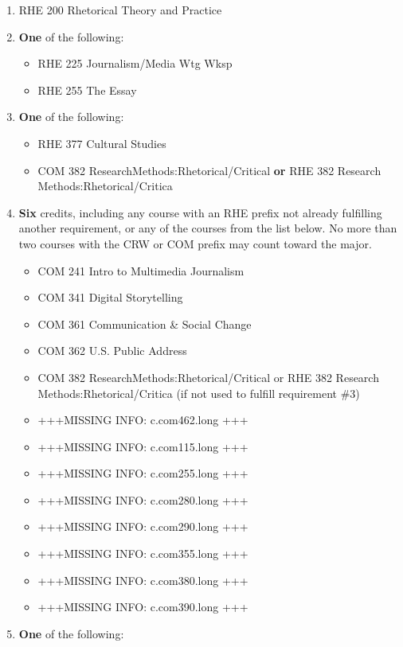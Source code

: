 \documentclass[
  letterpaper,
]{scrbook}
\providecommand{\tightlist}{%
  \setlength{\itemsep}{0pt}\setlength{\parskip}{0pt}}
\begin{document}
\begin{enumerate}
\def\labelenumi{\arabic{enumi}.}
\item
  RHE 200 Rhetorical Theory and Practice
\item
  \textbf{One} of the following:

  \begin{itemize}
  \tightlist
  \item
    RHE 225 Journalism/Media Wtg Wksp
  \item
    RHE 255 The Essay
  \end{itemize}
\item
  \textbf{One} of the following:

  \begin{itemize}
  \tightlist
  \item
    RHE 377 Cultural Studies
  \item
    COM 382 ResearchMethods:Rhetorical/Critical \textbf{or} RHE 382
    Research Methods:Rhetorical/Critica
  \end{itemize}
\item
  \textbf{Six} credits, including any course with an RHE prefix not
  already fulfilling another requirement, or any of the courses from the
  list below. No more than two courses with the CRW or COM prefix may
  count toward the major.

  \begin{itemize}
  \tightlist
  \item
    COM 241 Intro to Multimedia Journalism
  \item
    COM 341 Digital Storytelling
  \item
    COM 361 Communication \& Social Change
  \item
    COM 362 U.S. Public Address
  \item
    COM 382 ResearchMethods:Rhetorical/Critical or RHE 382 Research
    Methods:Rhetorical/Critica (if not used to fulfill requirement \#3)
  \item
    +++MISSING INFO: c.com462.long +++
  \item
    +++MISSING INFO: c.com115.long +++
  \item
    +++MISSING INFO: c.com255.long +++
  \item
    +++MISSING INFO: c.com280.long +++
  \item
    +++MISSING INFO: c.com290.long +++
  \item
    +++MISSING INFO: c.com355.long +++
  \item
    +++MISSING INFO: c.com380.long +++
  \item
    +++MISSING INFO: c.com390.long +++
  \end{itemize}
\item
  \textbf{One} of the following:


\end{enumerate}
\end{document}
